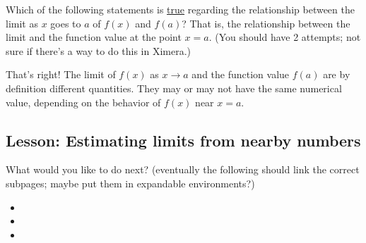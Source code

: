\documentclass{ximera}
\begin{document}
\begin{question}  
Which of the following statements is \underline{true} regarding the relationship between the limit as $x$ goes to $a$ of $f(x)$ and $f(a)$?  That is, the relationship between the limit and the function value at the point $x=a$. (You should have 2 attempts; not sure if there's a way to do this in Ximera.)
\begin{multipleChoice}  
\end{multipleChoice}  

\begin{explanation}
    That's right! The limit of $f(x)$ as $x \to a$ and the function value $f(a)$ are by definition different quantities. They may or may not have the same numerical value, depending on the behavior of $f(x)$ near $x=a$.
\end{explanation}
\end{question}

\subsection{Lesson: Estimating limits from nearby numbers}
\begin{center}
\end{center}

What would you like to do next?
(eventually the following should link the correct subpages; maybe put them in expandable environments?)
\begin{itemize}
    \item {} 
    \item {}
    \item {}
\end{itemize}
\end{document}
